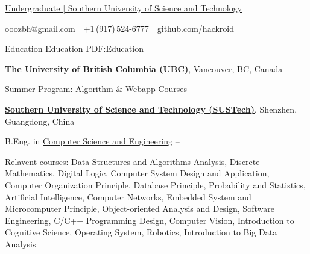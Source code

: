 \documentclass[a4paper,MMMyyyy,nonstopmode]{simpleresumecv}
\newcommand{\CVAuthor}{Bohong ZHAO}
\begin{document}

\Title{\CVAuthor}

\begin{SubTitle}
    \href{https://sustech.edu.cn/}
    {Undergraduate | Southern University of Science and Technology}
    \par
    \href{mailto:ooozbh@gmail.com}
    {ooozbh@gmail.com}
    \,\SubBulletSymbol\,
    +1\,(917)\,524-6777
    \,\SubBulletSymbol\,
    \href{https://github.com/hackroid/}{github.com/hackroid}
\end{SubTitle}

\begin{Body}


    \Section
    {Education}
    {Education}
    {PDF:Education}

    \Entry
    \href{https://www.ubc.ca/}
    {\textbf{The University of British Columbia (UBC)}},
    Vancouver, BC, Canada
    \hfill
     --

    \BulletItem
    Summer Program: Algorithm \& Webapp Courses

    \Gap
    \Entry
    \href{https://www.sustech.edu.cn/}
    {\textbf{Southern University of Science and Technology (SUSTech)}},
    Shenzhen, Guangdong, China

    \Gap
    \BulletItem
    B.Eng. in
    \href{http://cse.sustech.edu.cn/}
    {Computer Science and Engineering}
    \hfill
     --
    \begin{Detail}
        \SubBulletItem
        Relavent courses:
        Data Structures and Algorithms Analysis,
        Discrete Mathematics,
        Digital Logic,
        Computer System Design and Application,
        Computer Organization Principle,
        Database Principle,
        Probability and Statistics,
        Artificial Intelligence,
        Computer Networks,
        Embedded System and Microcomputer Principle,
        Object-oriented Analysis and Design,
        Software Engineering,
        C/C++ Programming Design,
        Computer Vision,
        Introduction to Cognitive Science,
        Operating System,
        Robotics,
        Introduction to Big Data Analysis
    \end{Detail}



\end{Body}
\end{document}
